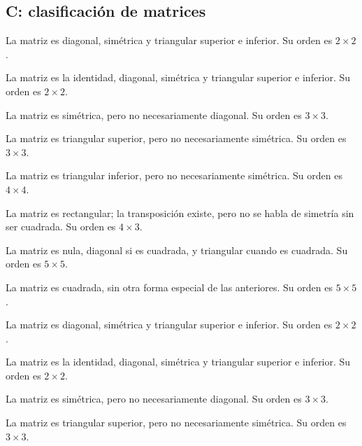 \documentclass[12pt]{article}
\theoremstyle{remark}
\begin{document}
\subsection*{C: clasificación de matrices}
\begin{description}[style=nextline,leftmargin=3em,itemsep=0.45em]
\item[E59.] La matriz es diagonal, simétrica y triangular superior e inferior. Su orden es $2\times2$.
\item[E60.] La matriz es la identidad, diagonal, simétrica y triangular superior e inferior. Su orden es $2\times2$.
\item[E61.] La matriz es simétrica, pero no necesariamente diagonal. Su orden es $3\times3$.
\item[E62.] La matriz es triangular superior, pero no necesariamente simétrica. Su orden es $3\times3$.
\item[E63.] La matriz es triangular inferior, pero no necesariamente simétrica. Su orden es $4\times4$.
\item[E64.] La matriz es rectangular; la transposición existe, pero no se habla de simetría sin ser cuadrada. Su orden es $4\times3$.
\item[E65.] La matriz es nula, diagonal si es cuadrada, y triangular cuando es cuadrada. Su orden es $5\times5$.
\item[E66.] La matriz es cuadrada, sin otra forma especial de las anteriores. Su orden es $5\times5$.
\item[E67.] La matriz es diagonal, simétrica y triangular superior e inferior. Su orden es $2\times2$.
\item[E68.] La matriz es la identidad, diagonal, simétrica y triangular superior e inferior. Su orden es $2\times2$.
\item[E69.] La matriz es simétrica, pero no necesariamente diagonal. Su orden es $3\times3$.
\item[E70.] La matriz es triangular superior, pero no necesariamente simétrica. Su orden es $3\times3$.
\end{description}
\end{document}
